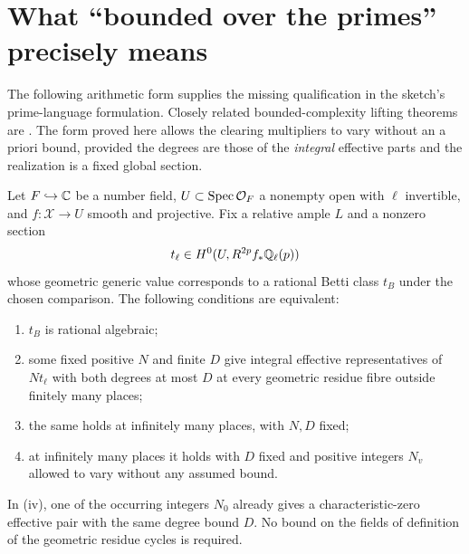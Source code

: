 \section{What ``bounded over the primes'' precisely means}\label{sec:primes}
The following arithmetic form supplies the missing qualification in the sketch's prime-language formulation. Closely related bounded-complexity lifting theorems are \citet[Definition~2.3 and Theorems~3.1, 3.4]{BrunjesSerpe09}. The form proved here allows the clearing multipliers to vary without an a priori bound, provided the degrees are those of the \emph{integral} effective parts and the realization is a fixed global section.

\begin{theorem}\label{P6}
Let $F\hookrightarrow\mathbb C$ be a number field, $U\subset\operatorname{Spec}\mathcal O_F$ a nonempty open with $\ell$ invertible, and $f:\mathcal X\to U$ smooth and projective. Fix a relative ample $L$ and a nonzero section
\[
 t_\ell\in H^0(U,R^{2p}f_*\mathbb Q_\ell(p))
\]
whose geometric generic value corresponds to a rational Betti class $t_B$ under the chosen comparison. The following conditions are equivalent:
\begin{enumerate}[label=(\roman*)]
\item $t_B$ is rational algebraic;
\item some fixed positive $N$ and finite $D$ give integral effective representatives of $Nt_\ell$ with both degrees at most $D$ at every geometric residue fibre outside finitely many places;
\item the same holds at infinitely many places, with $N,D$ fixed;
\item at infinitely many places it holds with $D$ fixed and positive integers $N_v$ allowed to vary without any assumed bound.
\end{enumerate}
In (iv), one of the occurring integers $N_0$ already gives a characteristic-zero effective pair with the same degree bound $D$. No bound on the fields of definition of the geometric residue cycles is required.
\end{theorem}

